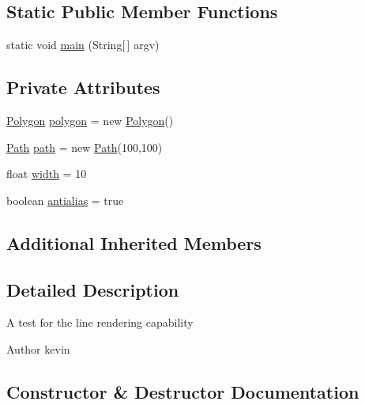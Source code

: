 \subsection*{Static Public Member Functions}
\begin{DoxyCompactItemize}
\item 
static void \mbox{\hyperlink{classorg_1_1newdawn_1_1slick_1_1tests_1_1_line_render_test_ad72202f3097ab237f9d3f747ad23a4f3}{main}} (String\mbox{[}$\,$\mbox{]} argv)
\end{DoxyCompactItemize}
\subsection*{Private Attributes}
\begin{DoxyCompactItemize}
\item 
\mbox{\hyperlink{classorg_1_1newdawn_1_1slick_1_1geom_1_1_polygon}{Polygon}} \mbox{\hyperlink{classorg_1_1newdawn_1_1slick_1_1tests_1_1_line_render_test_aaba1f6bea0eea4a16c3c5dbac6ed6f20}{polygon}} = new \mbox{\hyperlink{classorg_1_1newdawn_1_1slick_1_1geom_1_1_polygon}{Polygon}}()
\item 
\mbox{\hyperlink{classorg_1_1newdawn_1_1slick_1_1geom_1_1_path}{Path}} \mbox{\hyperlink{classorg_1_1newdawn_1_1slick_1_1tests_1_1_line_render_test_a1585e6e77bca69047a515e8f2cd9d650}{path}} = new \mbox{\hyperlink{classorg_1_1newdawn_1_1slick_1_1geom_1_1_path}{Path}}(100,100)
\item 
float \mbox{\hyperlink{classorg_1_1newdawn_1_1slick_1_1tests_1_1_line_render_test_a2280c24c277b9b676ff0af5863ed1527}{width}} = 10
\item 
boolean \mbox{\hyperlink{classorg_1_1newdawn_1_1slick_1_1tests_1_1_line_render_test_acf6b3869ee9b841334e44f56f15dfef0}{antialias}} = true
\end{DoxyCompactItemize}
\subsection*{Additional Inherited Members}


\subsection{Detailed Description}
A test for the line rendering capability

\begin{DoxyAuthor}{Author}
kevin 
\end{DoxyAuthor}


\subsection{Constructor \& Destructor Documentation}
\mbox{\label{classorg_1_1newdawn_1_1slick_1_1tests_1_1_line_render_test_a65089738ee2b44a06070e64f630cc2d3}} 
